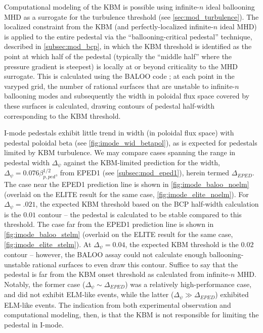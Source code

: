 Computational modeling of the KBM is possible using infinite-$n$ ideal ballooning MHD as a surrogate for the turbulence threshold \cite{Snyder2001,Candy2005,Snyder2009} (see \cref{sec:mod_turbulence}).  The localized constraint from the KBM (and perfectly-localized infinite-$n$ ideal MHD) is applied to the entire pedestal via the ``ballooning-critical pedestal'' technique, described in \cref{subsec:mod_bcp}, in which the KBM threshold is identified as the point at which half of the pedestal (typically the ``middle half'' where the pressure gradient is steepest) is locally at or beyond criticality to the MHD surrogate.  This is calculated using the BALOO code \cite{Connor1979,Miller1987}; at each point in the varyped grid, the number of rational surfaces that are unstable to infinite-$n$ ballooning modes and subsequently the width in poloidal flux space covered by these surfaces is calculated, drawing contours of pedestal half-width corresponding to the KBM threshold.

I-mode pedestals exhibit little trend in width (in poloidal flux space) with pedestal poloidal beta (see \cref{fig:imode_wid_betapol}), as is expected for pedestals limited by KBM turbulence.  We may compare cases spanning the range in pedestal width $\Delta_\psi$ against the KBM-limited prediction for the width, $\Delta_\psi = 0.076 \beta_{p,ped}^{1/2}$, from EPED1 (see \cref{subsec:mod_eped1}), herein termed $\Delta_{EPED}$.  The case near the EPED1 prediction line is shown in \cref{fig:imode_baloo_noelm} (overlaid on the ELITE result for the same case, \cref{fig:imode_elite_noelm}).  For $\Delta_\psi = .021$, the expected KBM threshold based on the BCP half-width calculation is the $0.01$ contour -- the pedestal is calculated to be stable compared to this threshold.  The case far from the EPED1 prediction line is shown in \cref{fig:imode_baloo_stelm} (overlaid on the ELITE result for the same case, \cref{fig:imode_elite_stelm}).  At $\Delta_\psi = 0.04$, the expected KBM threshold is the $0.02$ contour -- however, the BALOO assay could not calculate enough ballooning-unstable rational surfaces to even draw this contour.  Suffice to say that the pedestal is far from the KBM onset threshold as calculated from infinite-$n$ MHD.  Notably, the former case ($\Delta_\psi \sim \Delta_{EPED}$) was a relatively high-performance case, and did not exhibit ELM-like events, while the latter ($\Delta_\psi \gg \Delta_{EPED}$) exhibited ELM-like events.  The indication from both experimental observation and computational modeling, then, is that the KBM is not responsible for limiting the pedestal in I-mode.\nicesectionending

